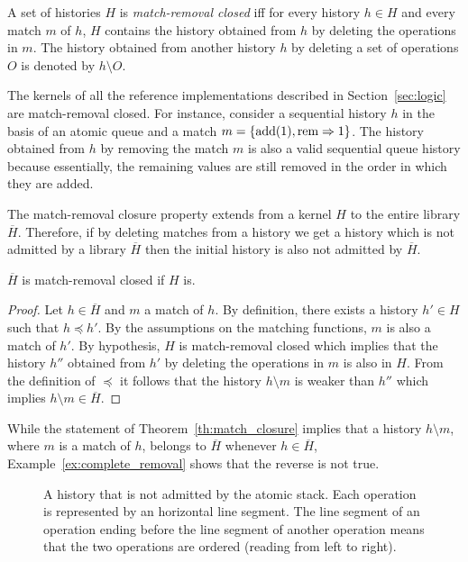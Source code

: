 A set of histories $H$ is \emph{match-removal closed} iff for every history
$h\in H$ and every match $m$ of $h$, $H$ contains the history obtained from $h$
by deleting the operations in $m$. The history obtained from another history
$h$ by deleting a set of operations $O$ is denoted by $h \setminus O$.

The kernels of all the reference implementations described in
Section~\ref{sec:logic} are match-removal closed. For instance, consider a
sequential history $h$ in the basis of an atomic queue and a match $m={\{ 
\text{add}(1), \text{rem}\Rightarrow1  \}}$. The history obtained from $h$ by
removing the match $m$ is also a valid sequential queue history because
essentially, the remaining values are still removed in the order in which they
are added.

The match-removal closure property extends from a kernel $H$ to the entire
library $\overline{H}$. Therefore, if by deleting matches from a history we get
a history which is not admitted by a library $\overline{H}$ then the initial
history is also not admitted by $\overline{H}$.

\begin{theorem}
  \label{th:match_closure}

  $\overline{H}$ is match-removal closed if $H$ is.

\end{theorem}

\begin{proof}

  Let $h\in \overline{H}$ and $m$ a match of $h$. By definition, there exists a
  history $h'\in H$ such that $h\preceq h'$. By the assumptions on the matching
  functions, $m$ is also a match of $h'$. By hypothesis, $H$ is match-removal
  closed which implies that the history $h''$ obtained from $h'$ by deleting
  the operations in $m$ is also in $H$. From the definition of $\preceq$ it
  follows that the history $h\setminus m$ is weaker than $h''$ which implies
  $h\setminus m\in \overline{H}$.

\end{proof}

While the statement of Theorem~\ref{th:match_closure} implies that a history
$h\setminus m$, where $m$ is a match of $h$, belongs to $\overline{H}$ whenever
$h\in \overline{H}$, Example~\ref{ex:complete_removal} shows that the reverse
is not true.

\begin{figure}

  

  \caption{A history that is not admitted by the atomic stack. Each operation
  is represented by an horizontal line segment. The line segment of an
  operation ending before the line segment of another operation means that the
  two operations are ordered (reading from left to right).}
  \label{fig:complete_removal}

\end{figure}

